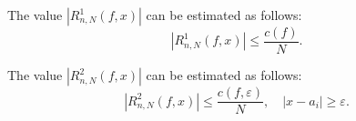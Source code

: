 \begin{lemma}\label{lemma:R1_estimate}
	The value $\left|R_{n,N}^1(f,x) \right|$ can be estimated as follows:
	\begin{equation*}
	\left| R_{n,N}^1 (f,x) \right| \leq \frac{c(f)}{N}.
	\end{equation*}
\end{lemma}

\begin{lemma}\label{lemma:R2_estimate}
	The value $\left|R_{n,N}^2(f,x) \right|$ can be estimated as follows:
	\begin{equation*}
	\left| R_{n,N}^2 (f,x) \right| \leq \frac{c(f,\varepsilon)}{N}, \quad \left|x - a_i\right| \geq \varepsilon.
	\end{equation*}
\end{lemma}


